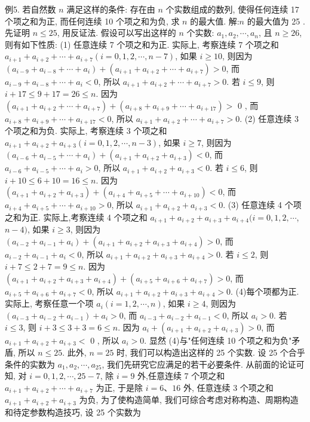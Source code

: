 例5. 若自然数 $n$ 满足这样的条件: 存在由 $n$ 个实数组成的数列, 使得任何连续 17 个项之和为正, 而任何连续 10 个项之和为负, 求 $n$ 的最大值.
解:$n$ 的最大值为 25 .
先证明 $n \leqslant 25$, 用反证法.
假设可以写出这样的 $n$ 个实数: $a_1, a_2, \cdots, a_n$, 且 $n \geqslant 26$, 则有如下性质:
(1) 任意连续 7 个项之和为正.
实际上, 考察连续 7 个项之和 $a_{i+1}+a_{i+2}+\cdots+a_{i+7}(i=0,1,2, \cdots, n- 7)$, 如果 $i \geqslant 10$, 则因为 $\left(a_{i-9}+a_{i-8}+\cdots+a_i\right)+\left(a_{i+1}+a_{i+2}+\cdots+a_{i+7}\right)>0$, 而 $a_{i-9}+a_{i-8}+\cdots+a_i<0$, 所以 $a_{i+1}+a_{i+2}+\cdots+a_{i+7}>0$. 若 $i \leqslant 9$, 则 $i+ 17 \leqslant 9+17=26 \leqslant n$. 因为 $\left(a_{i+1}+a_{i+2}+\cdots+a_{i+7}\right)+\left(a_{i+8}+a_{i+9}+\cdots+a_{i+17}\right)>$ 0 , 而 $a_{i+8}+a_{i+9}+\cdots+a_{i+17}<0$, 所以 $a_{i+1}+a_{i+2}+\cdots+a_{i+7}>0$.
(2) 任意连续 3 个项之和为负.
实际上, 考察连续 3 个项之和 $a_{i+1}+a_{i+2}+a_{i+3}(i=0,1,2, \cdots, n-3)$, 如果 $i \geqslant 7$, 则因为 $\left(a_{i-6}+a_{i-5}+\cdots+a_i\right)+\left(a_{i+1}+a_{i+2}+a_{i+3}\right)<0$, 而 $a_{i-6}+ a_{i-5}+\cdots+a_i>0$, 所以 $a_{i+1}+a_{i+2}+a_{i+3}<0$. 若 $i \leqslant 6$, 则 $i+10 \leqslant 6+10= 16 \leqslant n$. 因为 $\left(a_{i+1}+a_{i+2}+a_{i+3}\right)+\left(a_{i+4}+a_{i+5}+\cdots+a_{i+10}\right)<0$, 而 $a_{i+4}+ a_{i+5}+\cdots+a_{i+10}>0$, 所以 $a_{i+1}+a_{i+2}+a_{i+3}<0$.
(3) 任意连续 4 个项之和为正.
实际上,考察连续 4 个项之和 $a_{i+1}+a_{i+2}+a_{i+3}+a_{i+4}(i=0,1,2, \cdots$, $n-4)$, 如果 $i \geqslant 3$, 则因为 $\left(a_{i-2}+a_{i-1}+a_i\right)+\left(a_{i+1}+a_{i+2}+a_{i+3}+a_{i+4}\right)>0$, 而 $a_{i-2}+a_{i-1}+a_i<0$, 所以 $a_{i+1}+a_{i+2}+a_{i+3}+a_{i+4}>0$. 若 $i \leqslant 2$, 则 $i+7 \leqslant 2+7=9 \leqslant n$. 因为 $\left(a_{i+1}+a_{i+2}+a_{i+3}+a_{i+4}\right)+\left(a_{i+5}+a_{i+6}+a_{i+7}\right)>0$, 而 $a_{i+5}+a_{i+6}+a_{i+7}<0$, 所以 $a_{i+1}+a_{i+2}+a_{i+3}+a_{i+4}>0$.
(4)每个项都为正.
实际上, 考察任意一个项 $a_i(i=1,2, \cdots, n)$, 如果 $i \geqslant 4$, 则因为 $\left(a_{i-3}+\right. \left.a_{i-2}+a_{i-1}\right)+a_i>0$, 而 $a_{i-3}+a_{i-2}+a_{i-1}<0$, 所以 $a_i>0$. 若 $i \leqslant 3$, 则 $i+ 3 \leqslant 3+3=6 \leqslant n$. 因为 $a_i+\left(a_{i+1}+a_{i+2}+a_{i+3}\right)>0$, 而 $a_{i+1}+a_{i+2}+a_{i+3}<$ 0 , 所以 $a_i>0$.
显然 (4)与"任何连续 10 个项之和为负"矛盾, 所以 $n \leqslant 25$.
此外, $n=25$ 时, 我们可以构造出这样的 25 个实数.
设 25 个合乎条件的实数为 $a_1, a_2, \cdots, a_{25}$, 我们先研究它应满足的若干必要条件.
从前面的论证可知, 对 $i=0,1,2, \cdots, 25-7$, 除 $i=9$ 外,任意连续 7 个项之和 $a_{i+1}+a_{i+2}+\cdots+a_{i+7}$ 为正, 于是除 $i=6 、 16$ 外, 任意连续 3 个项之和 $a_{i+1}+a_{i+2}+a_{i+3}$ 为负, 为了使构造简单, 我们可综合考虑对称构造、周期构造和待定参数构造技巧, 设 25 个实数为
